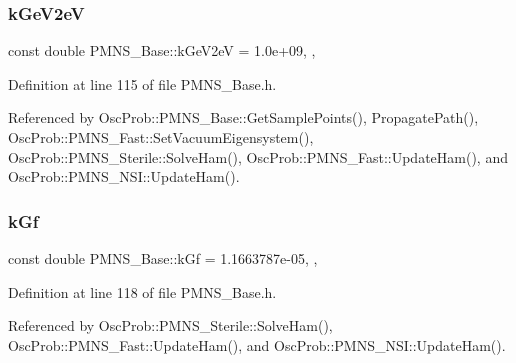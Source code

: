 \mbox{\label{classOscProb_1_1PMNS__Base_ad36a0a6bf58d6ec093d3947784bd89e9}} 
\subsubsection{\texorpdfstring{k\+Ge\+V2eV}{kGeV2eV}}
{\footnotesize\ttfamily const double P\+M\+N\+S\+\_\+\+Base\+::k\+Ge\+V2eV = 1.\+0e+09\hspace{0.3cm}{\ttfamily [static]}, {\ttfamily [protected]}, {\ttfamily [inherited]}}



Definition at line 115 of file P\+M\+N\+S\+\_\+\+Base.\+h.



Referenced by Osc\+Prob\+::\+P\+M\+N\+S\+\_\+\+Base\+::\+Get\+Sample\+Points(), Propagate\+Path(), Osc\+Prob\+::\+P\+M\+N\+S\+\_\+\+Fast\+::\+Set\+Vacuum\+Eigensystem(), Osc\+Prob\+::\+P\+M\+N\+S\+\_\+\+Sterile\+::\+Solve\+Ham(), Osc\+Prob\+::\+P\+M\+N\+S\+\_\+\+Fast\+::\+Update\+Ham(), and Osc\+Prob\+::\+P\+M\+N\+S\+\_\+\+N\+S\+I\+::\+Update\+Ham().

\mbox{\label{classOscProb_1_1PMNS__Base_a7f26a3456128234b2ae6cc9141a6532f}} 
\subsubsection{\texorpdfstring{k\+Gf}{kGf}}
{\footnotesize\ttfamily const double P\+M\+N\+S\+\_\+\+Base\+::k\+Gf = 1.\+1663787e-\/05\hspace{0.3cm}{\ttfamily [static]}, {\ttfamily [protected]}, {\ttfamily [inherited]}}



Definition at line 118 of file P\+M\+N\+S\+\_\+\+Base.\+h.



Referenced by Osc\+Prob\+::\+P\+M\+N\+S\+\_\+\+Sterile\+::\+Solve\+Ham(), Osc\+Prob\+::\+P\+M\+N\+S\+\_\+\+Fast\+::\+Update\+Ham(), and Osc\+Prob\+::\+P\+M\+N\+S\+\_\+\+N\+S\+I\+::\+Update\+Ham().


